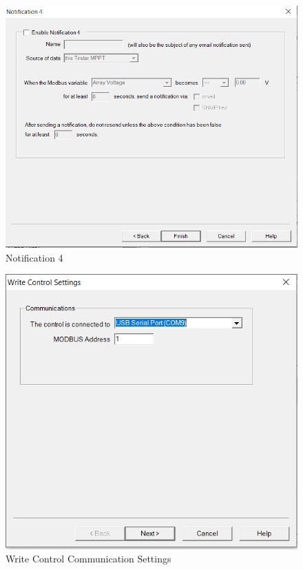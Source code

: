 \begin{figure}[!htb]
	\includegraphics[width=\textwidth,height=\textwidth]{./graphics/tsmppt_troubleshooting/ms_17.png}
	\caption{\label{fig:settings-12} Notification 4}
\end{figure}
\begin{figure}[!htb]
	\includegraphics[width=\textwidth,height=\textwidth]{./graphics/tsmppt_troubleshooting/ms_18.png}
	\caption{\label{fig:settings-13} Write Control Communication Settings}
\end{figure}
